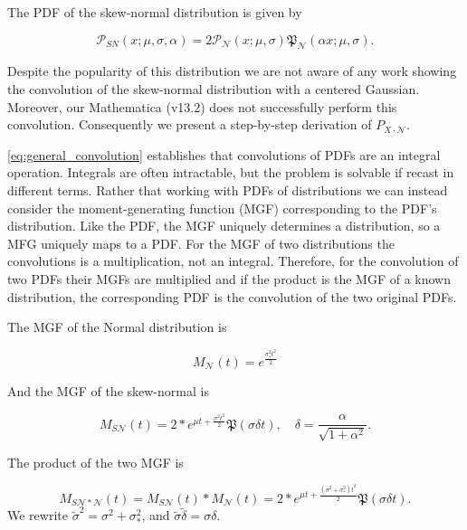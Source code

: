 \documentclass[twocolumn]{aastex631}
\newcommand{\mfk}[1]{\mathfrak{#1}}
\newcommand{\mcal}[1]{\mathcal{#1}}
\newcommand{\Exp}[1]{e^{#1}}
\newcommand{\pdf}{\mcal{P}}
\newcommand{\cdf}{\mfk{P}}
\begin{document}
        The PDF of the skew-normal distribution is given by

        \begin{equation}
            \pdf_{SN}(x;\mu,\sigma,\alpha) = 2\pdf_{\mcal{N}}(x;\mu,\sigma)\cdf_{\mcal{N}}(\alpha x;\mu,\sigma).
        \end{equation}

        Despite the popularity of this distribution we are not aware of any work
        showing the convolution of the skew-normal distribution with a centered
        Gaussian. Moreover, our Mathematica (v13.2) does not successfully
        perform this convolution. Consequently we present a step-by-step
        derivation of $P_{X\cdot\mcal{N}}$.

        \autoref{eq:general_convolution} establishes that convolutions of PDFs
        are an integral operation. Integrals are often intractable, but the
        problem is solvable if recast in different terms. Rather that working
        with PDFs of distributions we can instead consider the moment-generating
        function (MGF) corresponding to the PDF's distribution. Like the PDF,
        the MGF uniquely determines a distribution, so a MFG uniquely maps to a
        PDF. For the MGF of two distributions the convolutions is a
        multiplication, not an integral.  Therefore, for the convolution of two
        PDFs their MGFs are multiplied and if the product is the MGF of a known
        distribution, the corresponding PDF is the convolution of the two
        original PDFs.

        The MGF of the Normal distribution is

        \begin{equation} \label{eq:mgf_normal}
            M_{\mcal{N}}(t) = \Exp{\frac{\sigma_*^2 t^2}{2}}
        \end{equation}

        And the MGF of the skew-normal is

        \begin{equation} \label{eq:mgf_skewnormal}
            M_{S\mcal{N}}(t) = 2 * \Exp{\mu t + \frac{\sigma^2 t^2}{2}} \cdf(\sigma \delta t), \quad \delta = \frac{\alpha}{\sqrt{1 + \alpha^2}}.
        \end{equation}

        The product of the two MGF is

        \begin{equation}
            M_{S\mcal{N}*\mcal{N}}(t) = M_{S\mcal{N}}(t) * M_{\mcal{N}}(t) = 2 * \Exp{\mu t + \frac{(\sigma^2 + \sigma_*^2) t^2}{2}} \cdf(\sigma \delta t).
        \end{equation}
        We rewrite $\tilde\sigma^2 = \sigma^2 + \sigma_*^2$, and $\tilde{\sigma} \tilde{\delta} = \sigma \delta$.
\end{document}

